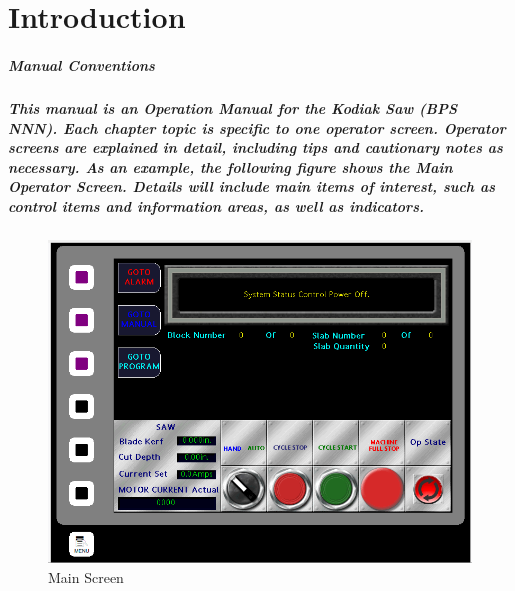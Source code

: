 \chapter{Introduction}
\paragraph{Manual Conventions}
\paragraph*{
This manual is an Operation Manual for the Kodiak Saw (BPS NNN). Each chapter topic is specific to one operator screen. Operator screens are explained in detail, including tips and cautionary notes as necessary. As an example, the following figure shows the Main Operator Screen. Details will include main items of interest, such as control items and information areas, as well as indicators. 
}
\begin{figure}
	\centering
	\includegraphics[width=0.7\linewidth]{screen-captures/main-screen}
	\caption{Main Screen}
	\label{fig:main-screen}
\end{figure}

